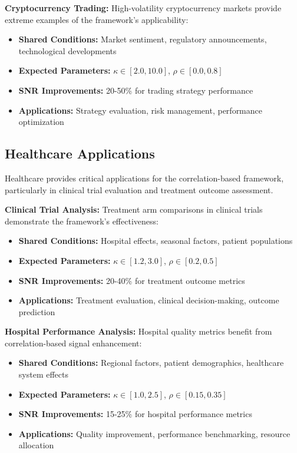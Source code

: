 \textbf{Cryptocurrency Trading:}
High-volatility cryptocurrency markets provide extreme examples of the framework's applicability:
\begin{itemize}
    \item \textbf{Shared Conditions:} Market sentiment, regulatory announcements, technological developments
    \item \textbf{Expected Parameters:} $\kappa \in [2.0, 10.0]$, $\rho \in [0.0, 0.8]$
    \item \textbf{SNR Improvements:} 20-50\% for trading strategy performance
    \item \textbf{Applications:} Strategy evaluation, risk management, performance optimization
\end{itemize}

\subsection{Healthcare Applications}

Healthcare provides critical applications for the correlation-based framework, particularly in clinical trial evaluation and treatment outcome assessment.

\textbf{Clinical Trial Analysis:}
Treatment arm comparisons in clinical trials demonstrate the framework's effectiveness:
\begin{itemize}
    \item \textbf{Shared Conditions:} Hospital effects, seasonal factors, patient populations
    \item \textbf{Expected Parameters:} $\kappa \in [1.2, 3.0]$, $\rho \in [0.2, 0.5]$
    \item \textbf{SNR Improvements:} 20-40\% for treatment outcome metrics
    \item \textbf{Applications:} Treatment evaluation, clinical decision-making, outcome prediction
\end{itemize}

\textbf{Hospital Performance Analysis:}
Hospital quality metrics benefit from correlation-based signal enhancement:
\begin{itemize}
    \item \textbf{Shared Conditions:} Regional factors, patient demographics, healthcare system effects
    \item \textbf{Expected Parameters:} $\kappa \in [1.0, 2.5]$, $\rho \in [0.15, 0.35]$
    \item \textbf{SNR Improvements:} 15-25\% for hospital performance metrics
    \item \textbf{Applications:} Quality improvement, performance benchmarking, resource allocation
\end{itemize}

